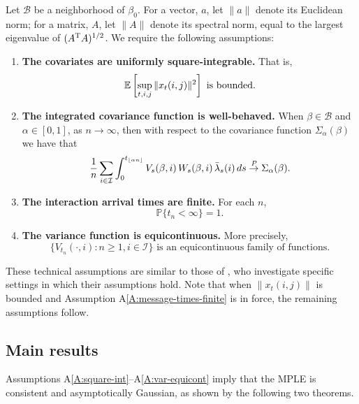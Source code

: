 \documentclass[final]{statsoc}
\begin{document}
Let $\mathcal{B}$ be a neighborhood of $\beta_0$.  For a vector, $a$, let
$\| a \|$ denote its Euclidean norm; for a matrix, $A$, let $\| A \|$ denote
its spectral norm, equal to the largest eigenvalue of $(A^{\mathrm{T}} A)^{1/2}$.
We require the following assumptions:
\begin{enumerate}[{A}1.]
    \item \label{A:square-int}
    \textbf{The covariates are uniformly square-integrable.}  That is,
    \[
        \mathbb{E}\left[
            \sup_{t, i, j} \| x_{t}(i,j) \|^2
        \right]
        \,\,\text{is bounded.}
    \]

    \item \label{A:integrated-cov-limit}
    \textbf{The integrated covariance function is well-behaved.}
    When $\beta \in \mathcal{B}$ and $\alpha \in [0,1]$, as $ n \to \infty$, then with respect to the covariance function $\Sigma_\alpha(\beta)$ we have that
    \[
        \frac{1}{n}
        \sum_{i \in \mathcal{I}}
        \int_0^{t_{\lfloor \alpha n \rfloor}}
            V_s(\beta,i)
            \, W_s(\beta,i)
            \, \bar \lambda_s(i)
            \, ds
        \overset{\mathit{P}}{\to}
        \Sigma_\alpha(\beta).
    \]

    \item \label{A:message-times-finite}
    \textbf{The interaction arrival times are finite.}  For each $n$,
    \[
        \mathbb{P}\{t_n < \infty\} = 1.
    \]

    \item \label{A:var-equicont}
    \textbf{The variance function is equicontinuous.}
    More precisely,
    \[
        \Big\{
            V_{t_n}(\cdot, i)
            :
            n \geq 1, i \in \mathcal{I}
        \Big\}
        \,\,\text{is an equicontinuous family of functions.}
    \]
\end{enumerate}

These technical assumptions are similar to those of
\citet{andersen1982cox}, who investigate specific settings in which their
assumptions hold.  Note that when $\| x_t(i,j) \|$ is bounded and Assumption
A\ref{A:message-times-finite} is in force, the remaining assumptions follow.

\subsection{Main results}
Assumptions A\ref{A:square-int}--A\ref{A:var-equicont} imply that the MPLE is consistent and asymptotically
Gaussian, as shown by the following two theorems.
\end{document}
